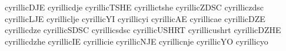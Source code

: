  cyrillicDJE    {}
 cyrillicdje    {}
 cyrillicTSHE   {}
 cyrillictshe   {}
 cyrillicZDSC   {}
 cyrilliczdsc   {}
 cyrillicLJE    {}
 cyrilliclje    {}
 cyrillicYI     {}
 cyrillicyi     {}
 cyrillicAE     {}
 cyrillicae     {}
 cyrillicDZE    {}
 cyrillicdze    {}
 cyrillicSDSC   {}
 cyrillicsdsc   {}
 cyrillicUSHRT  {}
 cyrillicushrt  {}
 cyrillicDZHE   {}
 cyrillicdzhe   {}
 cyrillicIE     {}
 cyrillicie     {}
 cyrillicNJE    {}
 cyrillicnje    {}
 cyrillicYO     {}
 cyrillicyo     {}

\stopencoding

\endinput
